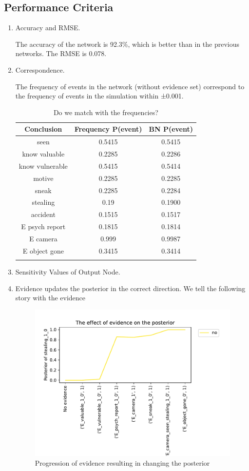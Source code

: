 \subsection{Performance Criteria}
\begin{enumerate}
\item Accuracy and RMSE.

The accuracy of the network is 92.3\%, which is better than in the previous networks. The RMSE is 0.078. 
\item Correspondence.

The frequency of events in the network (without evidence set) correspond to the frequency of events in the simulation within ±0.001.

\begin{table}
\centering
\begin{tabular}{|c|c|c|}
 \hline
 Conclusion & Frequency P(event) & BN P(event)\\
 \hline
seen   & 0.5415& 0.5415\\
know valuable & 0.2285 &  0.2286\\
know vulnerable & 0.5415 &  0.5414\\
motive & 0.2285 &  0.2285\\
sneak & 0.2285 & 0.2284\\
stealing & 0.19 & 0.1900\\
accident & 0.1515 & 0.1517 \\
E psych report & 0.1815 &  0.1814\\
E camera & 0.999 & 0.9987\\ 
E object gone & 0.3415 & 0.3414 \\
 \hline
\label{test}
\end{tabular}
\caption{Do we match with the frequencies?}
\end{table}


\item Sensitivity Values of Output Node.
\item Evidence updates the posterior in the correct direction.
We tell the following story with the evidence
\begin{figure}[htbp]
 \centering
\includegraphics[width=0.6\linewidth]{../experiments/GroteMarkt/plots/posterior_base_networkGroteMarkt.pdf}
\caption{ Progression of evidence resulting in changing the posterior}
\label{baseposterior}
\end{figure}%
\end{enumerate}

